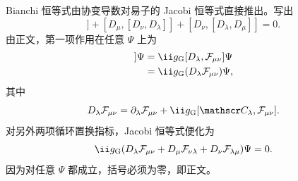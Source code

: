 \begin{derivation}
Bianchi 恒等式由协变导数对易子的 Jacobi 恒等式直接推出。写出
\begin{equation*}
 [D_\lambda,[D_\mu,D_\nu]]
 +[D_\mu,[D_\nu,D_\lambda]]
 +[D_\nu,[D_\lambda,D_\mu]]=0.
\end{equation*}
由正文，第一项作用在任意 $\Psi$ 上为
\begin{align*}
 [D_\lambda,[D_\mu,D_\nu]]\Psi
 &=\ii g_{\rm G}[D_\lambda,\mathcal F_{\mu\nu}]\Psi\\
 &=\ii g_{\rm G}(D_\lambda\mathcal F_{\mu\nu})\Psi,
\end{align*}
其中
\begin{equation*}
 D_\lambda\mathcal F_{\mu\nu}
 =\partial_\lambda\mathcal F_{\mu\nu}
 +\ii g_{\rm G}[\mathscr C_\lambda,\mathcal F_{\mu\nu}].
\end{equation*}
对另外两项循环置换指标，Jacobi 恒等式便化为
\begin{equation*}
 \ii g_{\rm G}
 (D_\lambda\mathcal F_{\mu\nu}
 +D_\mu\mathcal F_{\nu\lambda}
 +D_\nu\mathcal F_{\lambda\mu})\Psi=0.
\end{equation*}
因为对任意 $\Psi$ 都成立，括号必须为零，即正文。
\end{derivation}

